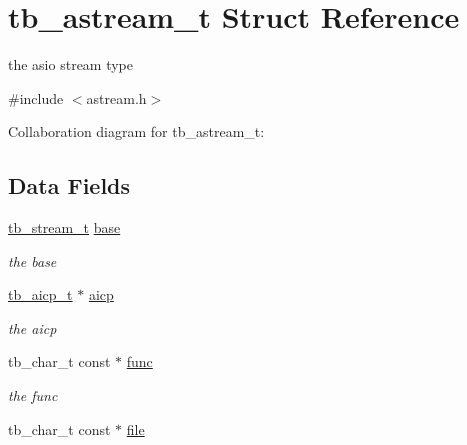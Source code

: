 \hypertarget{structtb__astream__t}{\section{tb\-\_\-astream\-\_\-t Struct Reference}
\label{structtb__astream__t}
}


the asio stream type  




{\ttfamily \#include $<$astream.\-h$>$}



Collaboration diagram for tb\-\_\-astream\-\_\-t\-:
\subsection*{Data Fields}
\begin{DoxyCompactItemize}
\item 
\hypertarget{structtb__astream__t_a9b41ea837b689f9e3ce4b95eeeeec690}{\hyperlink{structtb__stream__t}{tb\-\_\-stream\-\_\-t} \hyperlink{structtb__astream__t_a9b41ea837b689f9e3ce4b95eeeeec690}{base}}\label{structtb__astream__t_a9b41ea837b689f9e3ce4b95eeeeec690}

\begin{DoxyCompactList}\small\item\em the base \end{DoxyCompactList}\item 
\hypertarget{structtb__astream__t_a8968c7538f5a7dad9fc3490c7f6bdc8a}{\hyperlink{structtb__aicp__t}{tb\-\_\-aicp\-\_\-t} $\ast$ \hyperlink{structtb__astream__t_a8968c7538f5a7dad9fc3490c7f6bdc8a}{aicp}}\label{structtb__astream__t_a8968c7538f5a7dad9fc3490c7f6bdc8a}

\begin{DoxyCompactList}\small\item\em the aicp \end{DoxyCompactList}\item 
\hypertarget{structtb__astream__t_a758a20865d0e9bf0c6b0ee1613d7f9cb}{tb\-\_\-char\-\_\-t const $\ast$ \hyperlink{structtb__astream__t_a758a20865d0e9bf0c6b0ee1613d7f9cb}{func}}\label{structtb__astream__t_a758a20865d0e9bf0c6b0ee1613d7f9cb}

\begin{DoxyCompactList}\small\item\em the func \end{DoxyCompactList}\item 
\hypertarget{structtb__astream__t_a4b3a83dde03d7a779291cbeb1abf09af}{tb\-\_\-char\-\_\-t const $\ast$ \hyperlink{structtb__astream__t_a4b3a83dde03d7a779291cbeb1abf09af}{file}}\label{structtb__astream__t_a4b3a83dde03d7a779291cbeb1abf09af}


\end{DoxyCompactItemize}
